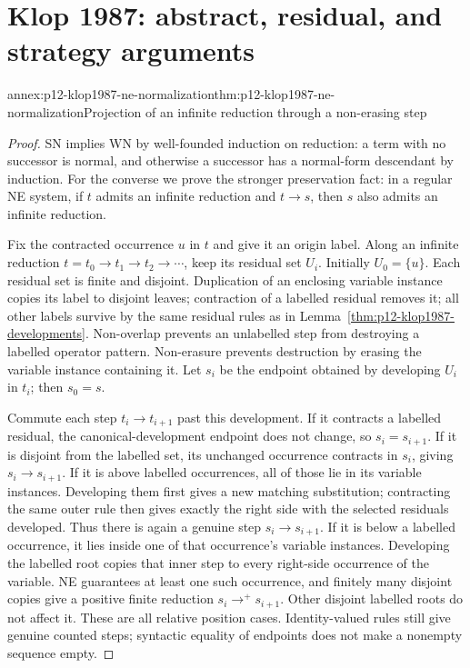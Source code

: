 \section{Klop 1987: abstract, residual, and strategy arguments}

\begin{annexitem}{annex:p12-klop1987-ne-normalization}{thm:p12-klop1987-ne-normalization}{Projection of an infinite reduction through a non-erasing step}
\begin{proof}
SN implies WN by well-founded induction on reduction: a term with no
successor is normal, and otherwise a successor has a normal-form descendant
by induction. For the converse we prove the stronger preservation fact:
in a regular NE system, if \(t\) admits an infinite reduction and
\(t\to s\), then \(s\) also admits an infinite reduction.

Fix the contracted occurrence \(u\) in \(t\) and give it an origin
label. Along an infinite reduction
\(t=t_0\to t_1\to t_2\to\cdots\), keep its residual set
\(U_i\). Initially \(U_0=\{u\}\). Each residual set is finite
and disjoint. Duplication of an enclosing variable instance copies its
label to disjoint leaves; contraction of a labelled residual removes it;
all other labels survive by the same residual rules as in
Lemma~\ref{thm:p12-klop1987-developments}. Non-overlap prevents an
unlabelled step from destroying a labelled operator pattern. Non-erasure
prevents destruction by erasing the variable instance containing it.
Let \(s_i\) be the endpoint obtained by developing \(U_i\) in
\(t_i\); then \(s_0=s\).

Commute each step \(t_i\to t_{i+1}\) past this development.
If it contracts a labelled residual, the canonical-development endpoint
does not change, so \(s_i=s_{i+1}\). If it is disjoint from the
labelled set, its unchanged occurrence contracts in \(s_i\), giving
\(s_i\to s_{i+1}\). If it is above labelled occurrences, all of
those lie in its variable instances. Developing them first gives a new
matching substitution; contracting the same outer rule then gives exactly
the right side with the selected residuals developed. Thus there is again
a genuine step \(s_i\to s_{i+1}\). If it is below a labelled
occurrence, it lies inside one of that occurrence's variable instances.
Developing the labelled root copies that inner step to every right-side
occurrence of the variable. NE guarantees at least one such occurrence,
and finitely many disjoint copies give a positive finite reduction
\(s_i\to^+s_{i+1}\). Other disjoint labelled roots do not affect
it. These are all relative position cases. Identity-valued rules still
give genuine counted steps; syntactic equality of endpoints does not
make a nonempty sequence empty.


\end{proof}
\end{annexitem}
